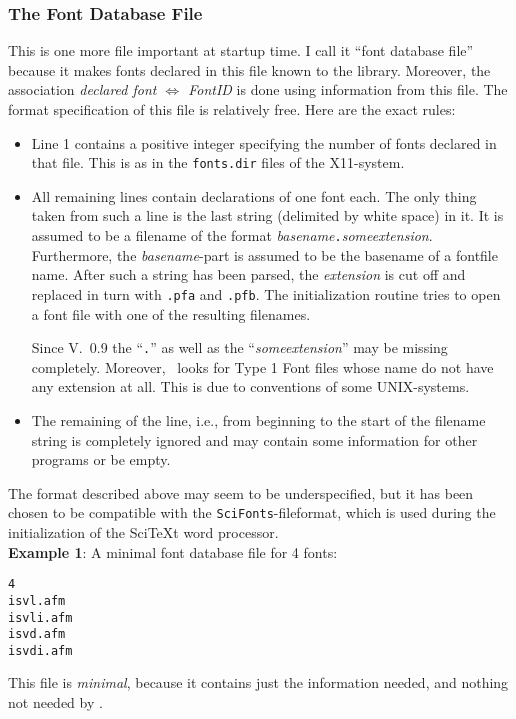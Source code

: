 \subsubsection{The Font Database File}
\label{fontdatabase}%
This is one more file important at startup time. I call it
``font database file'' because it makes fonts declared in this file
known to the library. Moreover, the association {\em declared font
  $\Longleftrightarrow$ FontID} is done using information from this
file. The format specification of this file is relatively free. Here are
the exact rules:
\begin{itemize}
\item Line 1 contains a positive integer specifying the
  number of fonts declared in that file. This is as in the
  \verb+fonts.dir+ files of the X11-system.
\item All remaining lines contain declarations of one font each. The
  only thing taken from such a line is the last string
  (delimited by white space) in it. It is assumed to be a
  filename of the format {\em basename}\verb+.+{\em someextension}.
  Furthermore, the {\em basename}-part is assumed to be the basename
  of a fontfile name.  After such a string has been parsed, the
  {\em extension} is cut off and replaced in turn with \verb+.pfa+ and
  \verb+.pfb+. The initialization routine tries to open a font
  file with one of the resulting filenames.

  Since V.~0.9 the ``\verb+.+'' as well as the ``{\em someextension}'' may be
  missing completely. Moreover, \tonelib\ looks for Type 1 Font files whose
  name do not have any extension at all. This is due to conventions of some
  UNIX-systems. 
\item The remaining of the line, i.e., from beginning to the start of the
  filename string is completely ignored and may contain some
  information for other programs or be empty.
\end{itemize}
The format described above may seem to be underspecified, but it has
been chosen to be compatible with the \verb+SciFonts+-fileformat,
which is used during the initialization of the SciTeXt word
processor. \\[2mm]
{\bfseries Example 1}: A minimal font database file for 4 fonts:

{\footnotesize
\begin{verbatim}
4
isvl.afm
isvli.afm
isvd.afm
isvdi.afm
\end{verbatim}
}%

This file is {\em minimal}, because it contains just the information
needed, and nothing not needed by \tonelib. 

